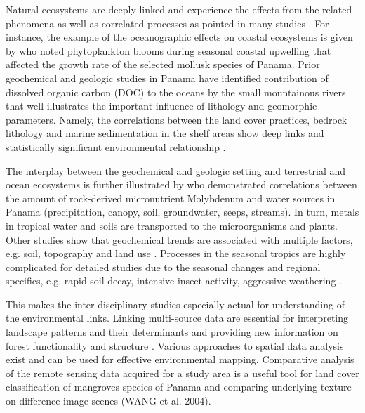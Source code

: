 \documentclass[10pt,twoside,twocolumn,a4paper]{article}
\begin{document}
Natural ecosystems are deeply linked and experience the effects from the related phenomena \cite{Benfield,Lee,Lemenkova202018} as well as correlated processes as pointed in many studies \cite{Ruane,Gohl2006a,Klauco2013,Kuhn2006}. For instance, the example of the oceanographic effects on coastal ecosystems is given by \cite{Sadatzki} who noted phytoplankton blooms during seasonal coastal upwelling that affected the growth rate of the selected mollusk species of Panama. Prior geochemical and geologic studies in Panama have identified contribution of dissolved organic carbon (DOC) to the oceans by the small mountainous rivers that well illustrates the important influence of lithology and geomorphic parameters. Namely, the correlations between the land cover practices, bedrock lithology and marine sedimentation in the shelf areas show deep links and statistically significant environmental relationship \cite{Goldsmith}.

The interplay between the geochemical and geologic setting and terrestrial and ocean ecosystems is further illustrated by \cite{Gardner} who demonstrated correlations between the amount of rock-derived micronutrient Molybdenum and water sources in Panama (precipitation, canopy, soil, groundwater, seeps, streams). In turn, metals in tropical water and soils are transported to the microorganisms and plants. 
Other studies show that geochemical trends are associated with multiple factors, e.g. soil, topography and land use \cite{Neumann}. Processes in the seasonal tropics are highly complicated for detailed studies due to the seasonal changes and regional specifics, e.g. rapid soil decay, intensive insect activity, aggressive weathering \cite{Niedzialek}. 

This makes the inter-disciplinary studies especially actual for understanding of the environmental links. Linking multi-source data are essential for interpreting landscape patterns and their determinants and providing new information on forest functionality and structure \cite{Higgins,Lemenkova202112,Klauco2017}. Various approaches to spatial data analysis exist and can be used for effective environmental mapping. Comparative analysis of the remote sensing data acquired for a study area is a useful tool for land cover classification of mangroves species of Panama and comparing underlying texture on difference image scenes (WANG et al. 2004).
\end{document}
